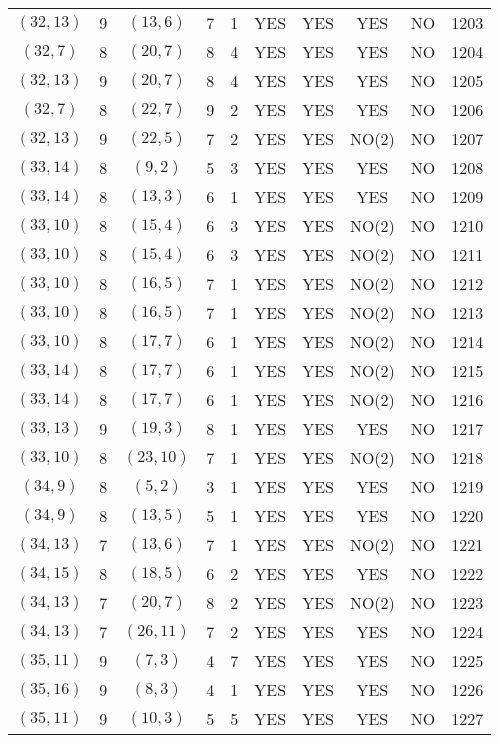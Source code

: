 \begin{longtable}{|c|c|c|c|c|c|c|c|c|c|}
$(32, 13)$ & 9 & $(13, 6)$ & 7 & 1 & YES & YES & YES & NO & 1203\\
$(32, 7)$ & 8 & $(20, 7)$ & 8 & 4 & YES & YES & YES & NO & 1204\\
$(32, 13)$ & 9 & $(20, 7)$ & 8 & 4 & YES & YES & YES & NO & 1205\\
$(32, 7)$ & 8 & $(22, 7)$ & 9 & 2 & YES & YES & YES & NO & 1206\\
$(32, 13)$ & 9 & $(22, 5)$ & 7 & 2 & YES & YES & NO(2) & NO & 1207\\
$(33, 14)$ & 8 & $(9, 2)$ & 5 & 3 & YES & YES & YES & NO & 1208\\
$(33, 14)$ & 8 & $(13, 3)$ & 6 & 1 & YES & YES & YES & NO & 1209\\
$(33, 10)$ & 8 & $(15, 4)$ & 6 & 3 & YES & YES & NO(2) & NO & 1210\\
$(33, 10)$ & 8 & $(15, 4)$ & 6 & 3 & YES & YES & NO(2) & NO & 1211\\
$(33, 10)$ & 8 & $(16, 5)$ & 7 & 1 & YES & YES & NO(2) & NO & 1212\\
$(33, 10)$ & 8 & $(16, 5)$ & 7 & 1 & YES & YES & NO(2) & NO & 1213\\
$(33, 10)$ & 8 & $(17, 7)$ & 6 & 1 & YES & YES & NO(2) & NO & 1214\\
$(33, 14)$ & 8 & $(17, 7)$ & 6 & 1 & YES & YES & NO(2) & NO & 1215\\
$(33, 14)$ & 8 & $(17, 7)$ & 6 & 1 & YES & YES & NO(2) & NO & 1216\\
$(33, 13)$ & 9 & $(19, 3)$ & 8 & 1 & YES & YES & YES & NO & 1217\\
$(33, 10)$ & 8 & $(23, 10)$ & 7 & 1 & YES & YES & NO(2) & NO & 1218\\
$(34, 9)$ & 8 & $(5, 2)$ & 3 & 1 & YES & YES & YES & NO & 1219\\
$(34, 9)$ & 8 & $(13, 5)$ & 5 & 1 & YES & YES & YES & NO & 1220\\
$(34, 13)$ & 7 & $(13, 6)$ & 7 & 1 & YES & YES & NO(2) & NO & 1221\\
$(34, 15)$ & 8 & $(18, 5)$ & 6 & 2 & YES & YES & YES & NO & 1222\\
$(34, 13)$ & 7 & $(20, 7)$ & 8 & 2 & YES & YES & NO(2) & NO & 1223\\
$(34, 13)$ & 7 & $(26, 11)$ & 7 & 2 & YES & YES & YES & NO & 1224\\
$(35, 11)$ & 9 & $(7, 3)$ & 4 & 7 & YES & YES & YES & NO & 1225\\
$(35, 16)$ & 9 & $(8, 3)$ & 4 & 1 & YES & YES & YES & NO & 1226\\
$(35, 11)$ & 9 & $(10, 3)$ & 5 & 5 & YES & YES & YES & NO & 1227\\

\end{longtable}
